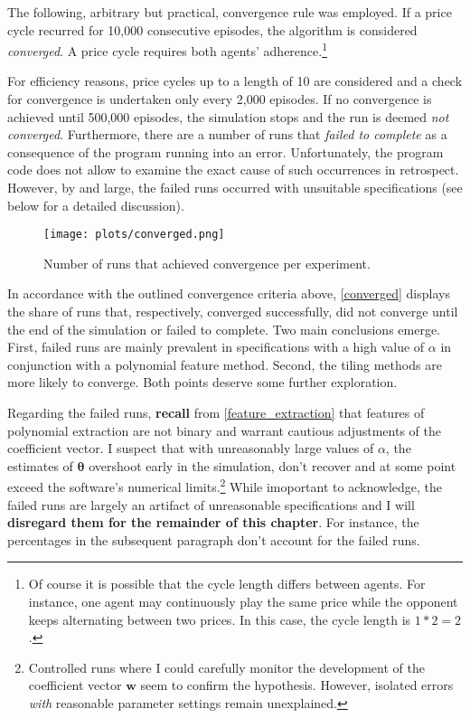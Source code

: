 The following, arbitrary but practical, convergence rule was employed. If a price cycle recurred for 10,000 consecutive episodes, the algorithm is considered \emph{converged}. A price cycle requires both agents' adherence.\footnote{Of course it is possible that the cycle length differs between agents. For instance, one agent may continuously play the same price while the opponent keeps alternating between two prices. In this case, the cycle length is $1*2=2$.}

For efficiency reasons, price cycles up to a length of 10 are considered and a check for convergence is undertaken only every 2,000 episodes. If no convergence is achieved until 500,000 episodes, the simulation stops and the run is deemed \emph{not converged}. Furthermore, there are a number of runs that \emph{failed to complete} as a consequence of the program running into an error. Unfortunately, the program code does not allow to examine the exact cause of such occurrences in retrospect. However, by and large, the failed runs occurred with unsuitable specifications (see below for a detailed discussion).

\begin{figure}
	\texttt{[image: plots/converged.png]}
	\caption{Number of runs that achieved convergence per experiment.}
	\label{converged}
\end{figure}

In accordance with the outlined convergence criteria above, \autoref{converged} displays the share of runs that, respectively, converged successfully, did not converge until the end of the simulation or failed to complete. Two main conclusions emerge. First, failed runs are mainly prevalent in specifications with a high value of $\alpha$ in conjunction with a polynomial feature method. Second, the tiling methods are more likely to converge. Both points deserve some further exploration.

Regarding the failed runs, \textbf{recall} from \autoref{feature_extraction} that features of polynomial extraction are not binary and warrant cautious adjustments of the coefficient vector. I suspect that with unreasonably large values of $\alpha$, the estimates of $\boldsymbol{\theta}$ overshoot early in the simulation, don't recover and at some point exceed the software's numerical limits.\footnote{Controlled runs where I could carefully monitor the development of the coefficient vector $\boldsymbol{w}$ seem to confirm the hypothesis. However, isolated errors \emph{with} reasonable parameter settings remain unexplained.} While imoportant to acknowledge, the failed runs are largely an artifact of unreasonable specifications and I will \textbf{disregard them for the remainder of this chapter}. For instance, the percentages in the subsequent paragraph don't account for the failed runs.

